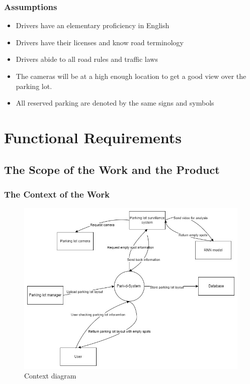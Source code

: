 \documentclass[12pt,letterpaper]{article}
\begin{document}
\subsubsection{Assumptions}
\begin{itemize}
    \item Drivers have an elementary proficiency in English
    \item Drivers have their licenses and know road terminology
    \item Drivers abide to all road rules and traffic laws
    \item The cameras will be at a high enough location to get a good view over
    the parking lot.
    \item All reserved parking are denoted by the same signs and symbols
\end{itemize}

\newpage
\section{Functional Requirements}

\subsection{The Scope of the Work and the Product}
\subsubsection{The Context of the Work}
\begin{figure}[ht]
    \includegraphics[scale=0.6]{context.jpg}
    \caption{Context diagram}
\end{figure}
\end{document}
